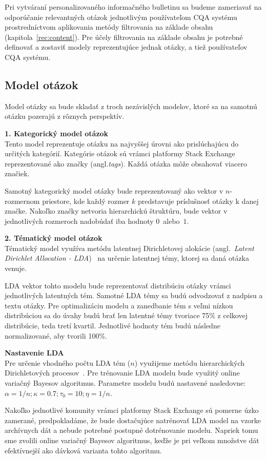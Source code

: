 Pri vytváraní personalizovaného informačného bulletinu sa budeme zameriavať na odporúčanie relevantných otázok jednotlivým
používateľom CQA systému prostredníctvom aplikovania metódy filtrovania na základe obsahu (kapitola~\ref{rec:content}).
Pre účely filtrovania na základe obsahu je potrebné definovať a zostaviť modely reprezentujúce jednak otázky, a tiež
používateľov CQA systému.

\subsection{Model otázok}

Model otázky sa bude skladať z troch nezávislých modelov, ktoré sa na samotnú otázku pozerajú z rôznych perspektív.

\textbf{1. Kategorický model otázok}\\
Tento model reprezentuje otázku na najvyššej úrovni ako prislúchajúcu do určitých kategórií. Kategórie otázok sú vrámci
platformy Stack Exchange reprezentované ako značky (angl.\textit{tags}). Každá otázka môže obsahovať viacero značiek.

Samotný kategorický model otázky bude reprezentovaný ako vektor v $n$-rozmernom priestore, kde každý rozmer $k$
predstavuje príslušnosť otázky k danej značke. Nakoľko značky netvoria hierarchickú štruktúru, bude vektor v jednotlivých
rozmeroch nadobúdať iba hodnoty $0$~alebo~$1$.

\textbf{2. Tématický model otázok}\\
Tématický model využíva metódu latentnej Dirichletovej alokácie (angl.~\emph{Latent Dirichlet Allocation - LDA})~\cite{blei2003latent}
na určenie latentnej témy, ktorej sa daná otázka venuje.

LDA vektor tohto modelu bude reprezentovať distribúciu otázky vrámci jednotlivých latentných tém.
Samotné LDA témy sa budú odvodzovať z nadpisu a textu otázky.
Pre optimalizáciu modelu a zanedbanie tém s veľmi nízkou distribúciou sa do úvahy budú brať len latentné témy tvoriace
75\% z celkovej distribúcie, teda tretí kvartil. Jednotlivé hodnoty tém budú následne normalizované, aby tvorili 100\%.

\begin{adjustwidth}{1cm}{1cm}
\textbf{Nastavenie LDA}\\
Pre určenie vhodného počtu LDA tém ($n$) využijeme metódu hierarchických Dirichletových procesov~\cite{Teh2006}.
Pre trénovanie LDA modelu bude využitý online variačný Bayesov algoritmus. Parametre modelu budú nastavené nasledovne:\\
$\alpha = 1/n; \kappa = 0.7; \tau_0 = 10; \eta = 1/n$.

Nakoľko jednotlivé komunity vrámci platformy Stack Exchange sú pomerne úzko zamerané, predpokladáme, že bude dostačujúce
natrénovať LDA model na vzorke archívnych dát a nebude potrebné postupné dotrénovanie modelu. Napriek tomu sme zvolili
online variačný Bayesov algoritmus, keďže je pri veľkom množstve dát efektívnejší ako dávková varianta tohto algoritmu.
\end{adjustwidth}

